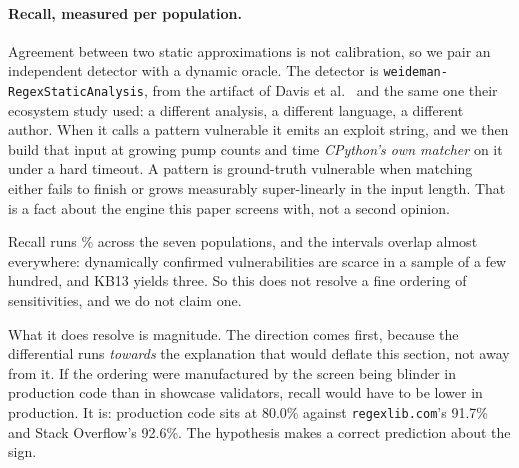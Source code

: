 \documentclass[11pt]{article}
\begin{document}
\paragraph{Recall, measured per population.} Agreement between two static
approximations is not calibration, so we pair an independent detector with a
dynamic oracle. The detector is
\texttt{weideman-RegexStaticAnalysis}, from the artifact of
Davis et al.~\citep{davis2019linguafranca} and the same one their ecosystem study used: a
different analysis, a different language, a different author. When it calls a
pattern vulnerable it emits an exploit string, and we then build that input at
growing pump counts and time \emph{CPython's own matcher} on it under a hard
timeout. A pattern is ground-truth vulnerable when matching either fails to
finish or grows measurably super-linearly in the input length. That is a fact
about the engine this paper screens with, not a second opinion.

\begin{table}[htbp]
\centering
\footnotesize
\setlength{\tabcolsep}{4pt}

\caption{Screen sensitivity per population. \emph{Unanalysable} counts
patterns the independent detector skipped or timed out on, which are neither
evidence for nor against. \emph{Caught/confirmed} is our screen's hits over
the patterns the detector flagged \emph{and} a timing measurement then
confirmed blow up under CPython. Recall is measured against what the detector
finds, so it is a relative sensitivity rather than an absolute one, which
is what the cross-population comparison needs, since the question is whether
the instrument is equally blind everywhere and not how blind it is. The
intervals are wide because dynamically confirmed vulnerabilities are scarce
in a sample of a few hundred; they are given so that the comparison is read
at the precision the counts support.}
\label{tab:calibration}
\end{table}

Recall runs \recallrange{}\% across the seven populations, and the intervals
overlap almost everywhere: dynamically confirmed vulnerabilities are scarce in
a sample of a few hundred, and KB13 yields three. So this does not resolve a
fine ordering of sensitivities, and we do not claim one.

What it does resolve is magnitude. The direction comes first, because the
differential runs \emph{towards} the explanation that would deflate this
section, not away from it. If the ordering were
manufactured by the screen being blinder in production code than in showcase
validators, recall would have to be lower in production. It is: production
code sits at 80.0\% against \texttt{regexlib.com}'s 91.7\% and Stack
Overflow's 92.6\%. The hypothesis makes a correct prediction about the sign.
\end{document}
